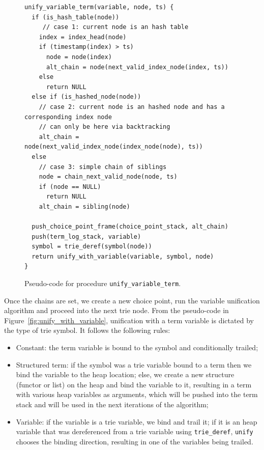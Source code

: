 \begin{figure}[h]
\begin{Verbatim}
unify_variable_term(variable, node, ts) {
  if (is_hash_table(node))
     // case 1: current node is an hash table
    index = index_head(node)
    if (timestamp(index) > ts)
      node = node(index)
      alt_chain = node(next_valid_index_node(index, ts))
    else
      return NULL
  else if (is_hashed_node(node))
    // case 2: current node is an hashed node and has a corresponding index node
    // can only be here via backtracking
    alt_chain = node(next_valid_index_node(index_node(node), ts))
  else
    // case 3: simple chain of siblings
    node = chain_next_valid_node(node, ts)
    if (node == NULL)
      return NULL
    alt_chain = sibling(node)
  
  push_choice_point_frame(choice_point_stack, alt_chain)
  push(term_log_stack, variable)
  symbol = trie_deref(symbol(node))
  return unify_with_variable(variable, symbol, node)
}
\end{Verbatim}
\caption{Pseudo-code for procedure \texttt{unify\_variable\_term}.}
\label{fig:unify_variable_term}
\end{figure}

Once the chains are set, we create a new choice point, run the variable unification algorithm
and proceed into the next trie node.
From the pseudo-code in Figure~\ref{fig:unify_with_variable}, unification with a term variable
is dictated by the type of trie symbol. It follows the following rules:

\begin{itemize}
  \item Constant: the term variable is bound to the symbol and conditionally trailed;
  \item Structured term: if the symbol was a trie variable bound to a term then we bind
  the variable to the heap location; else, we create a new structure (functor or list) on the heap and bind
  the variable to it, resulting in a term with various heap variables as arguments, which will be pushed into
  the term stack and will be used in the next iterations of the algorithm;
  \item Variable: if the variable is a trie variable, we bind and trail it; if it is an heap variable that
  was dereferenced from a trie variable using \texttt{trie\_deref}, \texttt{unify} chooses the binding direction,
  resulting in one of the variables being trailed.
\end{itemize}



